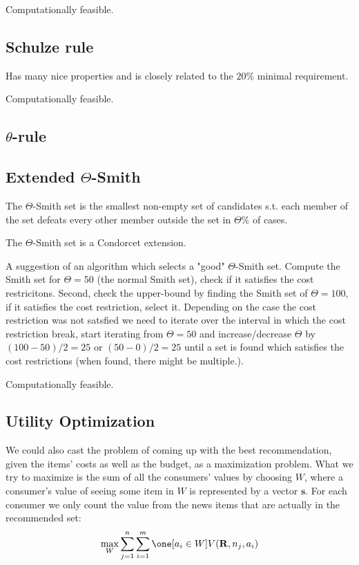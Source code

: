 \documentclass{article}
\begin{document}
Computationally feasible.\subsection{Schulze rule}

Has many nice properties and is closely related to the $20\%$ minimal requirement.

Computationally feasible.

\subsection{$\theta$-rule}

\subsection{Extended $\Theta$-Smith}

The $\Theta$-Smith set is the smallest non-empty set of candidates s.t. each member of the set defeats every other member outside
 the set in $\Theta \%$ of cases.

 The $\Theta$-Smith set is a Condorcet extension.

A suggestion of an algorithm which selects a "good" $\Theta$-Smith set. Compute the Smith set for $\Theta=50$
(the normal Smith set), check if it satisfies the cost restricitons. Second, check the upper-bound by finding the Smith
set of $\Theta=100$, if it satisfies the cost restriction, select it. Depending on the case the cost restriction was not
satsfied we need to iterate over the interval in which the cost restriction break, start iterating from $\Theta=50$ and
 increase/decrease $\Theta$ by $(100-50)/2=25$ or $(50-0)/2=25$ until a set is found which satisfies the cost
 restrictions (when found, there might be multiple.).

Computationally feasible.

\subsection{Utility Optimization}
We could also cast the problem of coming up with the best recommendation, 
given the items' costs as well as the budget, as a maximization problem. 
What we try to maximize is the sum of all the consumers' values by choosing $W$, 
where a consumer's value of seeing some item in $W$ is represented by a vector $\mathbf{s}$. 
For each consumer we only count the value from the news items that are actually in the recommended set:\\
\begin{equation}
\max_W \sum_{j=1}^n \sum_{i=1}^m \one [a_i\in W] V(\mathbf{R}, n_j, a_i)
\end{equation}
\end{document}
